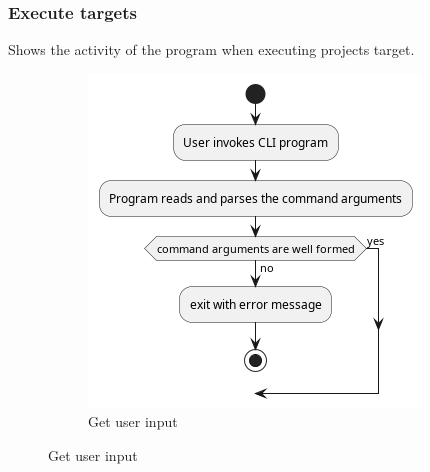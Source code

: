 \documentclass[11pt]{article}
\begin{document}
\subsubsection{Execute targets}

Shows the activity of the program when executing projects \gls{target}.

\begin{figure}[htbp]

  \begin{minipage}{0.45\textwidth}
    \centering
    \begin{subfigure}[b]{\linewidth}
      \includegraphics[width=\linewidth]{diags/activity.png}
      \caption{Get user input}
    \end{subfigure}

    \bigskip
    \addtocounter{subfigure}{1}


\end{minipage}
\end{figure}
\end{document}
